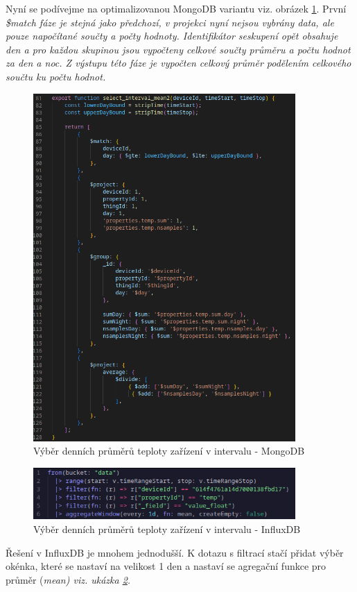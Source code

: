 \documentclass{article}
\begin{document}
Nyní se podívejme na optimalizovanou MongoDB variantu viz. obrázek \ref{mongo:basic:avg}. První \it{\$match} fáze je stejná jako předchozí, v projekci nyní nejsou vybrány data, ale pouze napočítané součty a počty hodnoty. Identifikátor seskupení opět obsahuje den a pro každou skupinou jsou vypočteny celkové součty průměru a počtu hodnot za den a noc. Z výstupu této fáze je vypočten celkový průměr podělením celkového součtu ku počtu hodnot.


\begin{figure}[htbp]
\includegraphics[width=10cm]{images/mongo_basic_avg.png}
\centering   
\caption{Výběr denních průměrů teploty zařízení v intervalu - MongoDB \label{mongo:basic:avg}} 
\end{figure}


\begin{figure}[htbp]
\includegraphics[width=10cm]{images/influx_simple_avg.png}
\centering   
\caption{Výběr denních průměrů teploty zařízení v intervalu - InfluxDB \label{influx:basic:avg}} 
\end{figure}

Řešení v InfluxDB je mnohem jednodušší. K dotazu s filtrací stačí přidat výběr okénka, které se nastaví na velikost 1 den a nastaví se agregační funkce pro průměr (\it{mean}) viz. ukázka \ref{influx:basic:avg}.
\end{document}
